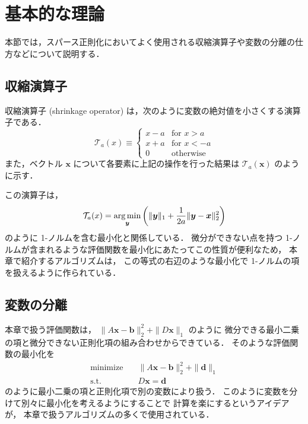 %

\section{基本的な理論}

本節では，スパース正則化においてよく使用される収縮演算子や変数の分離の仕方などについて説明する．

\subsection{収縮演算子}

収縮演算子 (shrinkage operator)
は，次のように変数の絶対値を小さくする演算子である．
\begin{equation}
    \mathcal{T}_a(x) \equiv
    \begin{cases}
        x - a & \text{for $x > a$}  \\
        x + a & \text{for $x < -a$} \\
        0     & \text{otherwise}
    \end{cases}
\end{equation}
また，ベクトル $\bm{x}$ について各要素に上記の操作を行った結果は
$\mathcal{T}_a(\bm{x})$ のように示す．

この演算子は，
\begin{equation}
    \mathcal{T}_a(x) =
    \operatorname*{arg \thinspace min}_{\bm{y}} \left(
    \|\bm{y}\|_1 + \frac{1}{2a} \|\bm{y} - \bm{x}\|_2^2
    \right)
\end{equation}
のように 1-ノルムを含む最小化と関係している．
微分ができない点を持つ 1-ノルムが含まれるような評価関数を最小化にあたってこの性質が便利なため，
本章で紹介するアルゴリズムは，
この等式の右辺のような最小化で 1-ノルムの項を扱えるように作られている．

\subsection{変数の分離}

本章で扱う評価関数は，
$\|A \bm{x} - \bm{b}\|_2^2 + \|D \bm{x}\|_1$ のように
微分できる最小二乗の項と微分できない正則化項の組み合わせからできている．
そのような評価関数の最小化を
\begin{align}
    \text{minimize} \hspace{1em} & \|A \bm{x} - \bm{b}\|_2^2 + \|\bm{d}\|_1 \\
    \text{s.t.} \hspace{1em}     & D \bm{x} = \bm{d}
\end{align}
のように最小二乗の項と正則化項で別の変数により扱う．
このように変数を分けて別々に最小化を考えるようにすることで
計算を楽にするというアイデアが，
本章で扱うアルゴリズムの多くで使用されている．
